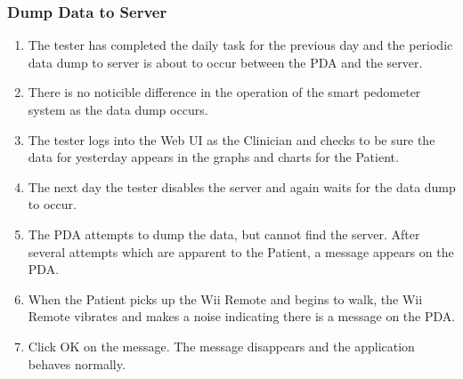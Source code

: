 \documentclass{article}
\begin{document}
\subsubsection{Dump Data to Server}
\begin{enumerate}
\item The tester has completed the daily task for the previous day and the periodic data dump to server is about to occur between the PDA and the server.
\item There is no noticible difference in the operation of the smart pedometer system as the data dump occurs.
\item The tester logs into the Web UI as the Clinician and checks to be sure the data for yesterday appears in the graphs and charts for the Patient.
\item The next day the tester disables the server and again waits for the data dump to occur.
\item The PDA attempts to dump the data, but cannot find the server. After several attempts which are apparent to the Patient, a message appears on the PDA.
\item When the Patient picks up the Wii Remote and begins to walk, the Wii Remote vibrates and makes a noise indicating there is a message on the PDA.
\item Click OK on the message. The message disappears and the application behaves normally.
\end{enumerate}
\end{document}
